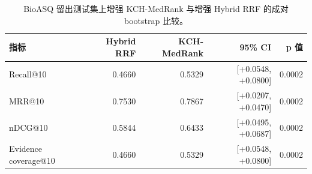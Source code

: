 \begin{table}[t]
\centering
\small
\caption{BioASQ 留出测试集上增强 KCH-MedRank 与增强 Hybrid RRF 的成对 bootstrap 比较。}
\label{tab:enhanced-bioasq-bootstrap-hybrid}
\begin{tabular}{lrrrr}
\toprule
指标 & Hybrid RRF & KCH-MedRank & 95\% CI & p 值 \\
\midrule
Recall@10 & 0.4660 & 0.5329 & [+0.0548, +0.0800] & 0.0002 \\
MRR@10 & 0.7530 & 0.7867 & [+0.0207, +0.0470] & 0.0002 \\
nDCG@10 & 0.5844 & 0.6433 & [+0.0495, +0.0687] & 0.0002 \\
Evidence coverage@10 & 0.4660 & 0.5329 & [+0.0548, +0.0800] & 0.0002 \\
\bottomrule
\end{tabular}
\end{table}
